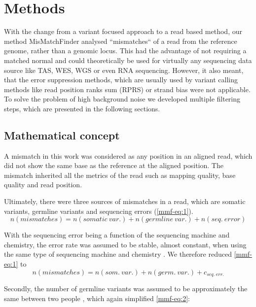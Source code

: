 \section{Methods}
\label{mmf-sec:methods}

With the change from a variant focused approach to a read based method, our method  MisMatchFinder analysed ``mismatches`` of a read from the reference genome, rather than a genomic locus. This had the advantage of not requiring a matched normal and could theoretically be used for virtually any sequencing data source like TAS, WES, WGS or even RNA sequencing. However, it also meant, that the error suppression methods, which are usually used by variant calling methods like read position ranks sum (RPRS) or strand bias were not applicable. To solve the problem of high background noise we developed multiple filtering steps, which are presented in the following sections.

\subsection{Mathematical concept}
\label{mmf-sec:concept}
A mismatch in this work was considered as any position in an aligned read, which did not show the same base as the reference at the aligned position. The mismatch inherited all the metrics of the read such as mapping quality, base quality and read position. 

Ultimately, there were three sources of mismatches in a read, which are somatic variants, germline variants and sequencing errors (\autoref{mmf-eq:1}).
\begin{equation}
n(mismatches) = n(somatic~var.) + n(germline~var.)  + n(seq.~ error)
\label{mmf-eq:1}
\end{equation}
\myequation[\ref{mmf-eq:1}]{MisMatchFinder: number of mismatches}

With the sequencing error being a function of the sequencing machine and chemistry, the error rate was assumed to be stable, almost constant, when using the same type of sequencing machine and chemistry \cite{Schirmer2016,Stoler2021}. We therefore reduced \autoref{mmf-eq:1} to
\begin{equation}
n(mismatches) = n(som.~var.) + n(germ.~var.)  + c_{seq.~err.}
\label{mmf-eq:2}
\end{equation}
\myequation[\ref{mmf-eq:2}]{MisMatchFinder: sequencing error}

Secondly, the number of germline variants was assumed to be approximately the same between two people \cite{Auton2015}, which again simplified \autoref{mmf-eq:2}:

